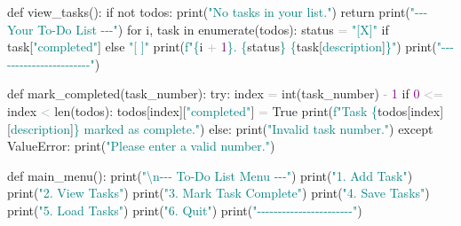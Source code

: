 \documentclass[
  justified,
  openright,
]{tufte-book}
\newcommand{\BuiltInTok}[1]{#1}
\newcommand{\CharTok}[1]{\textcolor{Teal}{#1}}
\newcommand{\ControlFlowTok}[1]{\textcolor{BrandBlue}{#1}}
\newcommand{\DecValTok}[1]{\textcolor{Purple}{#1}}
\newcommand{\KeywordTok}[1]{\textcolor{BrandBlue}{#1}}
\newcommand{\NormalTok}[1]{#1}
\newcommand{\OperatorTok}[1]{\textcolor{DarkGray}{#1}}
\newcommand{\PreprocessorTok}[1]{\textcolor{BrandAccent}{#1}}
\newcommand{\SpecialCharTok}[1]{\textcolor{Teal}{#1}}
\newcommand{\SpecialStringTok}[1]{\textcolor{Teal}{#1}}
\newcommand{\StringTok}[1]{\textcolor{Teal}{#1}}
\newcommand{\VariableTok}[1]{#1}
\newenvironment{Shaded}{%
  \begin{snugshade}
}{%
  \end{snugshade}
}
\begin{document}
\begin{Shaded}
\begin{Highlighting}[]
\KeywordTok{def}\NormalTok{ view\_tasks():}
    \ControlFlowTok{if} \KeywordTok{not}\NormalTok{ todos:}
        \BuiltInTok{print}\NormalTok{(}\StringTok{"No tasks in your list."}\NormalTok{)}
        \ControlFlowTok{return}
    \BuiltInTok{print}\NormalTok{(}\StringTok{"{-}{-}{-} Your To{-}Do List {-}{-}{-}"}\NormalTok{)}
    \ControlFlowTok{for}\NormalTok{ i, task }\KeywordTok{in} \BuiltInTok{enumerate}\NormalTok{(todos):}
\NormalTok{        status }\OperatorTok{=} \StringTok{"[X]"} \ControlFlowTok{if}\NormalTok{ task[}\StringTok{"completed"}\NormalTok{] }\ControlFlowTok{else} \StringTok{"[ ]"}
        \BuiltInTok{print}\NormalTok{(}\SpecialStringTok{f"}\SpecialCharTok{\{}\NormalTok{i }\OperatorTok{+} \DecValTok{1}\SpecialCharTok{\}}\SpecialStringTok{. }\SpecialCharTok{\{}\NormalTok{status}\SpecialCharTok{\}}\SpecialStringTok{ }\SpecialCharTok{\{}\NormalTok{task[}\StringTok{\textquotesingle{}description\textquotesingle{}}\NormalTok{]}\SpecialCharTok{\}}\SpecialStringTok{"}\NormalTok{)}
    \BuiltInTok{print}\NormalTok{(}\StringTok{"{-}{-}{-}{-}{-}{-}{-}{-}{-}{-}{-}{-}{-}{-}{-}{-}{-}{-}{-}{-}{-}{-}{-}"}\NormalTok{)}


\KeywordTok{def}\NormalTok{ mark\_completed(task\_number):}
    \ControlFlowTok{try}\NormalTok{:}
\NormalTok{        index }\OperatorTok{=} \BuiltInTok{int}\NormalTok{(task\_number) }\OperatorTok{{-}} \DecValTok{1}
        \ControlFlowTok{if} \DecValTok{0} \OperatorTok{\textless{}=}\NormalTok{ index }\OperatorTok{\textless{}} \BuiltInTok{len}\NormalTok{(todos):}
\NormalTok{            todos[index][}\StringTok{"completed"}\NormalTok{] }\OperatorTok{=} \VariableTok{True}
            \BuiltInTok{print}\NormalTok{(}\SpecialStringTok{f"Task \textquotesingle{}}\SpecialCharTok{\{}\NormalTok{todos[index][}\StringTok{\textquotesingle{}description\textquotesingle{}}\NormalTok{]}\SpecialCharTok{\}}\SpecialStringTok{\textquotesingle{} marked as complete."}\NormalTok{)}
        \ControlFlowTok{else}\NormalTok{:}
            \BuiltInTok{print}\NormalTok{(}\StringTok{"Invalid task number."}\NormalTok{)}
    \ControlFlowTok{except} \PreprocessorTok{ValueError}\NormalTok{:}
        \BuiltInTok{print}\NormalTok{(}\StringTok{"Please enter a valid number."}\NormalTok{)}


\KeywordTok{def}\NormalTok{ main\_menu():}
    \BuiltInTok{print}\NormalTok{(}\StringTok{"}\CharTok{\textbackslash{}n}\StringTok{{-}{-}{-} To{-}Do List Menu {-}{-}{-}"}\NormalTok{)}
    \BuiltInTok{print}\NormalTok{(}\StringTok{"1. Add Task"}\NormalTok{)}
    \BuiltInTok{print}\NormalTok{(}\StringTok{"2. View Tasks"}\NormalTok{)}
    \BuiltInTok{print}\NormalTok{(}\StringTok{"3. Mark Task Complete"}\NormalTok{)}
    \BuiltInTok{print}\NormalTok{(}\StringTok{"4. Save Tasks"}\NormalTok{)}
    \BuiltInTok{print}\NormalTok{(}\StringTok{"5. Load Tasks"}\NormalTok{)}
    \BuiltInTok{print}\NormalTok{(}\StringTok{"6. Quit"}\NormalTok{)}
    \BuiltInTok{print}\NormalTok{(}\StringTok{"{-}{-}{-}{-}{-}{-}{-}{-}{-}{-}{-}{-}{-}{-}{-}{-}{-}{-}{-}{-}{-}{-}{-}"}\NormalTok{)}



\end{Highlighting}
\end{Shaded}
\end{document}
